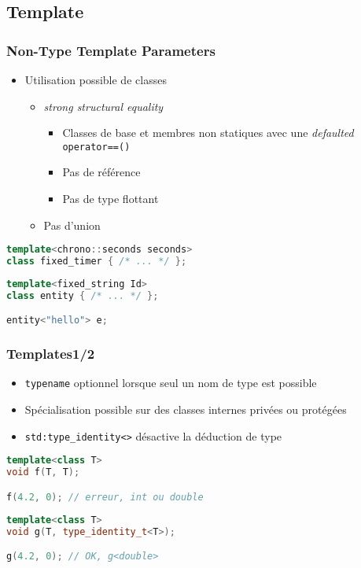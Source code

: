 \documentclass[C++.tex]{subfiles}
\begin{document}
\subsection*{Template}
\begin{frame}[fragile]
	\frametitle{Non-Type Template Parameters}
	\begin{itemize}
		\item Utilisation possible de classes
		\begin{itemize}
			\item \textit{strong structural equality}
			\begin{itemize}
				\item Classes de base et membres non statiques avec une \textit{defaulted} \lstinline|operator==()|
				\item Pas de référence
				\item Pas de type flottant
			\end{itemize}
			\item Pas d'union
		\end{itemize}
	\end{itemize}

	\begin{lstlisting}[language=C++]
template<chrono::seconds seconds>
class fixed_timer { /* ... */ };\end{lstlisting}


	\begin{lstlisting}[language=C++]
template<fixed_string Id>
class entity { /* ... */ };

entity<"hello"> e;\end{lstlisting}

\end{frame}

\begin{frame}[fragile]
	\frametitle{Templates\titlehfill{}1/2}
	\begin{itemize}
		\item \lstinline|typename| optionnel lorsque seul un nom de type est possible
		

		\item Spécialisation possible sur des classes internes privées ou protégées
		\item \lstinline|std:type_identity<>| désactive la déduction de type
	\end{itemize}

	\begin{lstlisting}[language=C++]
template<class T>
void f(T, T);

f(4.2, 0); // erreur, int ou double\end{lstlisting}

	\begin{lstlisting}[language=C++]
template<class T>
void g(T, type_identity_t<T>);

g(4.2, 0); // OK, g<double>\end{lstlisting}
\end{frame}
\end{document}
